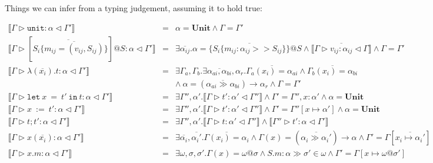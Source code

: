 \documentclass{article}
\begin{document}
Things we can infer from a typing judgement, assuming it to hold true:

\[
\begin{array}{lll}
\llbracket \Gamma \triangleright \mathtt{unit} : \alpha \triangleleft \Gamma' \rrbracket
& = & 
\alpha = \mathbf{Unit} \wedge \Gamma = \Gamma' \\

\llbracket \Gamma \triangleright [ \overline{S_i \{ \overline{ m_{ij} = (v_{ij}, S_{ij}) } } \} ]@S : \alpha \triangleleft \Gamma' \rrbracket
& = & 
\exists \overline{\alpha_{ij}} .
\alpha = \{ \overline{ S_i \{ m_{ij} : \alpha_{ij} >> S_{ij} \} }\}@S \wedge
\overline{\llbracket \Gamma \triangleright v_{ij} : \alpha_{ij} \triangleleft \Gamma \rrbracket}
\wedge \Gamma = \Gamma' \\

\llbracket \Gamma \triangleright \lambda ( \overline{x_i} ) . t : \alpha \triangleleft \Gamma' \rrbracket
& = &
\exists \Gamma_a, \Gamma_b . \exists \overline{\alpha_{ai}, \alpha_{bi}}, \alpha_r . 
\overline{\Gamma_a(x_i) = \alpha_{ai}} \wedge \overline{\Gamma_b(x_i) = \alpha_{bi}} \\
&&\wedge\:\alpha = (\overline{\alpha_{ai} \gg \alpha_{bi}}) \rightarrow \alpha_r \wedge \Gamma = \Gamma' \\

\llbracket \Gamma \triangleright \mathtt{let}\:x\:\mathtt{=}\:t'\:\mathtt{in}\:t : \alpha \triangleleft \Gamma' \rrbracket
& = & 
\exists \Gamma'', \alpha' . 
\llbracket \Gamma \triangleright t' : \alpha' \triangleleft \Gamma'' \rrbracket \wedge 
\Gamma' = \Gamma'', x : \alpha' \wedge
\alpha = \mathbf{Unit} \\

\llbracket \Gamma \triangleright x\:\mathtt{:=}\:t' : \alpha \triangleleft \Gamma' \rrbracket
& = &
\exists \Gamma'', \alpha' . 
\llbracket \Gamma \triangleright t' : \alpha' \triangleleft \Gamma'' \rrbracket \wedge 
\Gamma' = \Gamma'' [ x \mapsto \alpha' ] \wedge
\alpha = \mathbf{Unit} \\

\llbracket \Gamma \triangleright t ; t' : \alpha \triangleleft \Gamma' \rrbracket
& = &
\exists \Gamma'', \alpha' . 
\llbracket \Gamma \triangleright t : \alpha' \triangleleft \Gamma'' \rrbracket \wedge 
\llbracket \Gamma'' \triangleright t' : \alpha \triangleleft \Gamma' \rrbracket \\

\llbracket \Gamma \triangleright x ( \overline{x_i} ) : \alpha \triangleleft \Gamma' \rrbracket
& = &
\exists \overline{\alpha_i}, \overline{\alpha_i'} .
\overline{\Gamma(x_i) = \alpha_i} \wedge
\Gamma(x) = ( \overline{\alpha_i \gg \alpha_i'} ) \rightarrow \alpha \wedge
\Gamma' = \Gamma [ \overline{x_i \mapsto \alpha_i'} ] \\

\llbracket \Gamma \triangleright x.m : \alpha \triangleleft \Gamma' \rrbracket
& = &
\exists \omega, \sigma, \sigma' . 
\Gamma(x) = \omega @ \sigma \wedge
S.m : \alpha \gg \sigma' \in \omega \wedge
\Gamma' = \Gamma[ x \mapsto \omega @ \sigma' ] \\

\end{array}
\]
\end{document}

